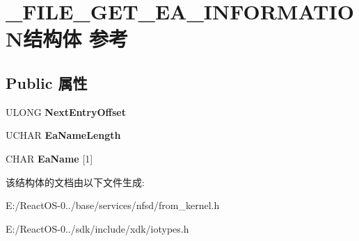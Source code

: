 \hypertarget{struct___f_i_l_e___g_e_t___e_a___i_n_f_o_r_m_a_t_i_o_n}{}\section{\+\_\+\+F\+I\+L\+E\+\_\+\+G\+E\+T\+\_\+\+E\+A\+\_\+\+I\+N\+F\+O\+R\+M\+A\+T\+I\+O\+N结构体 参考}
\label{struct___f_i_l_e___g_e_t___e_a___i_n_f_o_r_m_a_t_i_o_n}
\subsection*{Public 属性}
\begin{DoxyCompactItemize}
\item 
\mbox{\label{struct___f_i_l_e___g_e_t___e_a___i_n_f_o_r_m_a_t_i_o_n_a77c5b07136253cc2a3b2f0b9542262b7}} 
U\+L\+O\+NG {\bfseries Next\+Entry\+Offset}
\item 
\mbox{\label{struct___f_i_l_e___g_e_t___e_a___i_n_f_o_r_m_a_t_i_o_n_a00d4ae01f260bad82d85ba52279afd75}} 
U\+C\+H\+AR {\bfseries Ea\+Name\+Length}
\item 
\mbox{\label{struct___f_i_l_e___g_e_t___e_a___i_n_f_o_r_m_a_t_i_o_n_a91586b9e4d48bd344e797cd1e178af86}} 
C\+H\+AR {\bfseries Ea\+Name} \mbox{[}1\mbox{]}
\end{DoxyCompactItemize}


该结构体的文档由以下文件生成\+:\begin{DoxyCompactItemize}
\item 
E\+:/\+React\+O\+S-\/0../base/services/nfsd/from\+\_\+kernel.\+h\item 
E\+:/\+React\+O\+S-\/0../sdk/include/xdk/iotypes.\+h\end{DoxyCompactItemize}
